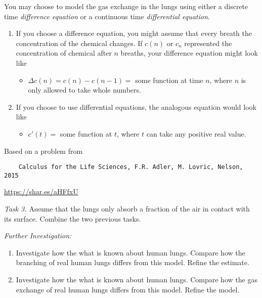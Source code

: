 \begin{graybox}
You may choose to model the gas exchange in the lungs using either a discrete time \emph{difference equation} or a continuous time \emph{differential equation}.
	\begin{enumerate}[label=\emph{(\alph*)}]
	\item If you choose a difference equation, you might assume that every breath the concentration of the chemical changes. If $c(n)$ or $c_n$ represented the concentration of chemical after $n$ breaths, your difference equation might look like
	\begin{itemize}
		\item $\Delta c(n) = c(n) - c(n-1) =$ some function at time $n$, where $n$ is only allowed to take whole numbers.
	\end{itemize}

	\item If you choose to use differential equations, the analogous equation would look like
	\begin{itemize}
		\item $c'(t)=$ some function at $t$, where $t$ can take any positive real value.  
	\end{itemize}
\end{enumerate}
\end{graybox}

\begin{graybox}
\begin{minipage}{.8\textwidth}
Based on a problem from

\begin{verbatim}
	Calculus for the Life Sciences, F.R. Adler, M. Lovric, Nelson, 2015
\end{verbatim}
\begin{center}
\url{https://shar.es/aHFfxU}
\end{center}
\end{minipage}
\hfill
\begin{minipage}{.17\textwidth}
	\hfill{}
\end{minipage}
\end{graybox}



\vfill

\emph{Task 3. } Assume that the lungs only absorb a fraction of the air in contact with its surface. Combine the two previous tasks.

\vfill

\emph{Further Investigation:}
\begin{enumerate}[label=\emph{\arabic*.}]
	\item Investigate how the what is known about human lungs. Compare how the branching of real human lungs differs from this model. Refine the estimate.
	\item Investigate how the what is known about human lungs. Compare how the gas exchange of real human lungs differs from this model. Refine the model.
\end{enumerate}

